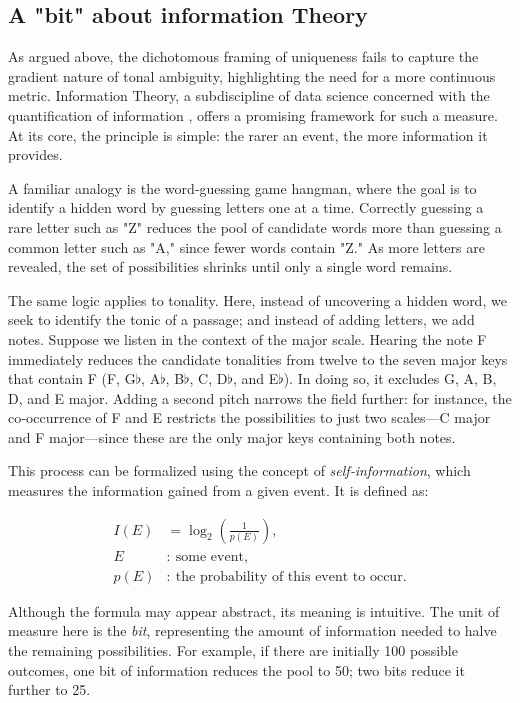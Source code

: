 \documentclass[10pt,twocolumn]{article}
\numberwithin{equation}{section} %
\begin{document}
    \subsection{A "bit" about information Theory}

    As argued above, the dichotomous framing of uniqueness fails to capture the gradient nature of tonal ambiguity, highlighting the need for a more continuous metric.
    Information Theory, a subdiscipline of data science concerned with the quantification of information \citep{shannon1948}, offers a promising framework for such a measure.
    At its core, the principle is simple: the rarer an event, the more information it provides.

    A familiar analogy is the word‑guessing game hangman, where the goal is to identify a hidden word by guessing letters one at a time.
    Correctly guessing a rare letter such as "Z" reduces the pool of candidate words more than guessing a common letter such as "A," since fewer words contain "Z."
    As more letters are revealed, the set of possibilities shrinks until only a single word remains.

    The same logic applies to tonality.
    Here, instead of uncovering a hidden word, we seek to identify the tonic of a passage; and instead of adding letters, we add notes.
    Suppose we listen in the context of the major scale.
    Hearing the note F immediately reduces the candidate tonalities from twelve to the seven major keys that contain F (F, G$\flat$, A$\flat$, B$\flat$, C, D$\flat$, and E$\flat$).
    In doing so, it excludes G, A, B, D, and E major.
    Adding a second pitch narrows the field further: for instance, the co‑occurrence of F and E restricts the possibilities to just two scales—C major and F major—since these are the only major keys containing both notes.

    This process can be formalized using the concept of \textit{self}\textit{‑}\textit{information}, which measures the information gained from a given event.
    It is defined as:

    \begin{align}
        I(E) &= \log_{2} \left( \frac{1}{p(E)} \right), \\
        E &:\ \text{some event}, \\
        p(E) &:\ \text{the probability of this event to occur}.
    \end{align}


    Although the formula may appear abstract, its meaning is intuitive.
    The unit of measure here is the \textit{bit}, representing the amount of information needed to halve the remaining possibilities.
    For example, if there are initially 100 possible outcomes, one bit of information reduces the pool to 50; two bits reduce it further to 25.
\end{document}

